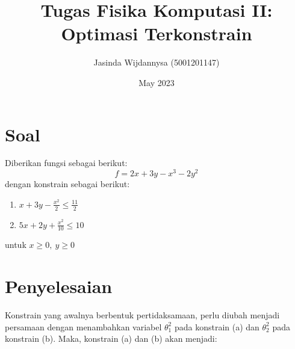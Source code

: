 \documentclass{article}
\title{\textbf{Tugas Fisika Komputasi II: Optimasi Terkonstrain}}
\author{Jasinda Wijdannysa (5001201147)}
\affil{Departemen Fisika, Institut Teknologi Sepuluh Nopember}
\date{May 2023}
\begin{document}
\maketitle

\section*{Soal}
\begin{centering}
Diberikan fungsi sebagai berikut:
\[f=2x+3y-x^3-2y^2\]
dengan konstrain sebagai berikut:
\begin{enumerate}[label=(\alph*)] \centering
    \item \(x+3y-\frac{x^2}{2} \le \frac{11}{2}\)
    \item \(5x+2y+\frac{x^2}{10} \le 10\)
\end{enumerate}

untuk \(x \ge 0,\ y \ge 0\)

\end{centering}

\section*{Penyelesaian}
Konstrain yang awalnya berbentuk pertidaksamaan, perlu diubah menjadi persamaan dengan menambahkan variabel \(\theta_1^2\) pada konstrain (a) dan \(\theta_2^2\) pada konstrain (b). Maka, konstrain (a) dan (b) akan menjadi:
\end{document}
